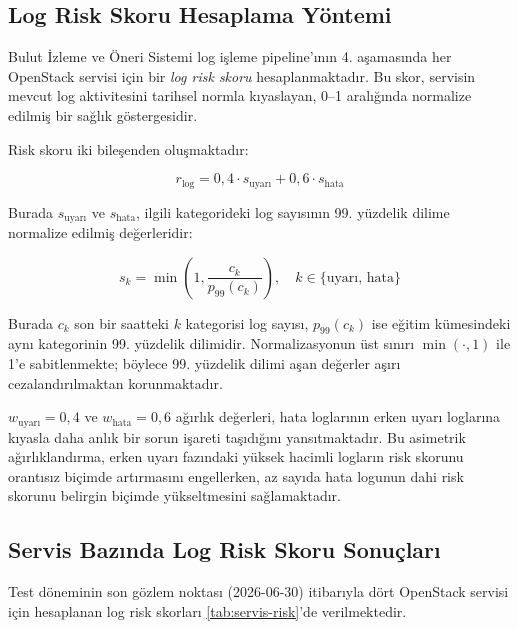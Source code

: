 \subsection{Log Risk Skoru Hesaplama Yöntemi}

Bulut İzleme ve Öneri Sistemi log işleme pipeline'ının 4. aşamasında her OpenStack servisi için bir \textit{log risk skoru} hesaplanmaktadır.
Bu skor, servisin mevcut log aktivitesini tarihsel normla kıyaslayan, 0--1 aralığında normalize edilmiş bir sağlık göstergesidir.

Risk skoru iki bileşenden oluşmaktadır:

\begin{equation}
    r_{\text{log}} = 0{,}4 \cdot s_{\text{uyarı}} + 0{,}6 \cdot s_{\text{hata}}
    \label{eq:logrisk}
\end{equation}

Burada $s_{\text{uyarı}}$ ve $s_{\text{hata}}$, ilgili kategorideki log sayısının 99. yüzdelik dilime normalize edilmiş değerleridir:

\begin{equation}
    s_k = \min\!\left(1, \frac{c_k}{p_{99}(c_k)}\right), \quad k \in \{\text{uyarı, hata}\}
    \label{eq:normalize}
\end{equation}

Burada $c_k$ son bir saatteki $k$ kategorisi log sayısı, $p_{99}(c_k)$ ise eğitim kümesindeki aynı kategorinin 99. yüzdelik dilimidir.
Normalizasyonun üst sınırı $\min(\cdot, 1)$ ile 1'e sabitlenmekte; böylece 99. yüzdelik dilimi aşan değerler aşırı cezalandırılmaktan korunmaktadır.

$w_{\text{uyarı}} = 0{,}4$ ve $w_{\text{hata}} = 0{,}6$ ağırlık değerleri, hata loglarının erken uyarı loglarına kıyasla daha anlık bir sorun işareti taşıdığını yansıtmaktadır.
Bu asimetrik ağırlıklandırma, erken uyarı fazındaki yüksek hacimli logların risk skorunu orantısız biçimde artırmasını engellerken, az sayıda hata logunun dahi risk skorunu belirgin biçimde yükseltmesini sağlamaktadır.

\subsection{Servis Bazında Log Risk Skoru Sonuçları}

Test döneminin son gözlem noktası (2026-06-30) itibarıyla dört OpenStack servisi için hesaplanan log risk skorları \autoref{tab:servis-risk}'de verilmektedir.

